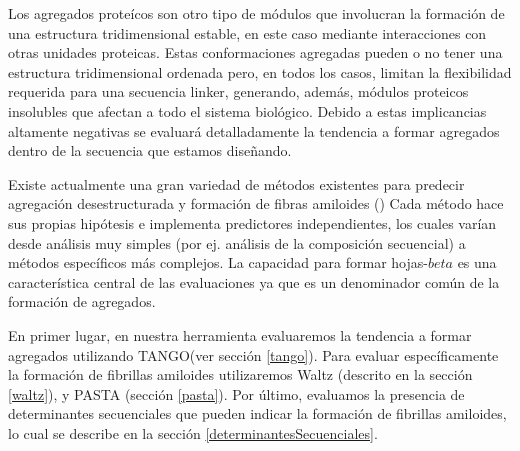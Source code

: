 Los agregados proteícos son otro tipo de módulos que involucran la formación de una estructura tridimensional estable, en este caso mediante interacciones con otras unidades proteicas.
Estas conformaciones agregadas pueden o no tener una estructura tridimensional ordenada pero, en todos los casos, limitan la flexibilidad requerida para una secuencia linker, generando, además,
módulos proteicos insolubles que afectan a todo el sistema biológico.
Debido a estas implicancias altamente negativas se evaluará detalladamente la tendencia a formar agregados dentro de la secuencia que estamos diseñando.
 

Existe actualmente una gran variedad de métodos existentes para predecir agregación desestructurada y formación de fibras amiloides (\cite{hamodrakas2011protein,redler2014computational,agrawal2011aggregation})
Cada método hace sus propias hipótesis e implementa predictores independientes, los cuales varían desde análisis muy simples (por ej. análisis de la composición secuencial) a métodos específicos más complejos.
La capacidad para formar hojas-$beta$ es una característica central de las evaluaciones ya que es un denominador común de la formación de agregados.

En primer lugar, en nuestra herramienta evaluaremos la tendencia a formar agregados utilizando TANGO(ver sección \ref{tango}). 
Para evaluar específicamente la formación de fibrillas amiloides utilizaremos Waltz (descrito en la sección \ref{waltz}), y PASTA (sección \ref{pasta}).
Por último, evaluamos la presencia de determinantes secuenciales que pueden indicar la formación de fibrillas amiloides, lo cual se describe en la sección \ref{determinantesSecuenciales}.



















